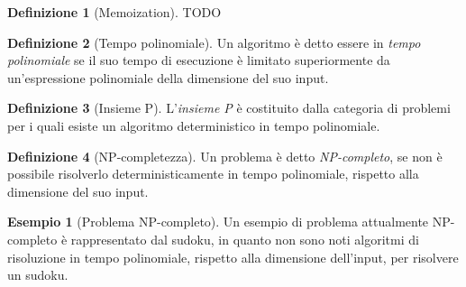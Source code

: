 \documentclass[14pt]{extreport}
\theoremstyle{definition}
\newtheorem{definition}{Definizione}[subsection]
\theoremstyle{definition}
\newtheorem{example}{Esempio}[subsection]
\begin{document}
\begin{definition}[Memoization]
    TODO
\end{definition}

\begin{definition}[Tempo polinomiale]
    Un algoritmo è detto essere in \textit{tempo polinomiale} se il suo tempo di esecuzione è limitato superiormente da un'espressione polinomiale della dimensione del suo input.
\end{definition}

\begin{definition}[Insieme P]
    L'\textit{insieme P} è costituito dalla categoria di problemi per i quali esiste un algoritmo deterministico in tempo polinomiale.
\end{definition}

\begin{definition}[NP-completezza]
    Un problema è detto \textit{NP-completo}, se non è possibile risolverlo deterministicamente in tempo polinomiale, rispetto alla dimensione del suo input.
\end{definition}

\begin{example}[Problema NP-completo]
    Un esempio di problema attualmente NP-completo è rappresentato dal sudoku, in quanto non sono noti algoritmi di risoluzione in tempo polinomiale, rispetto alla dimensione dell'input, per risolvere un sudoku.
\end{example}
\end{document}
